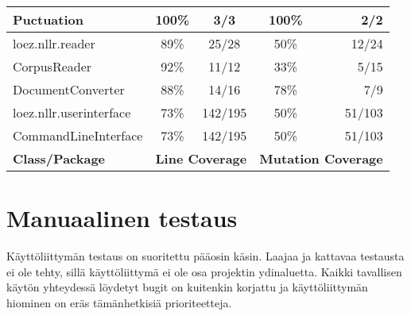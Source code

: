 \documentclass[12pt,a4paper]{article}
\begin{document}
\begin{tabular}{l |c |c |c |r}
\hspace{10 mm}Puctuation & 100\% & 3/3 & 100\% & 2/2 \\
\hline
loez.nllr.reader & 89\% & 25/28 & 50\% & 12/24 \\
\hspace{10 mm}CorpusReader & 92\% & 11/12 & 33\% & 5/15 \\
\hspace{10 mm}DocumentConverter & 88\% & 14/16 & 78\% & 7/9 \\
\hline
loez.nllr.userinterface & 73\% & 142/195 & 50\% & 51/103 \\
\hspace{10 mm}CommandLineInterface & 73\% & 142/195 & 50\% & 51/103 \\
\hline
\textbf{Class/Package}		&	\multicolumn{2}{|c}{\textbf{Line Coverage}} & \multicolumn{2}{|c}{\textbf{Mutation Coverage}} \\
\end{tabular}

\section{Manuaalinen testaus}
Käyttöliittymän testaus on suoritettu pääosin käsin. Laajaa ja kattavaa testausta ei ole tehty, sillä käyttöliittymä ei ole osa projektin ydinaluetta. Kaikki tavallisen käytön yhteydessä löydetyt bugit on kuitenkin korjattu ja käyttöliittymän hiominen on eräs tämänhetkisiä prioriteetteja.
\end{document}
